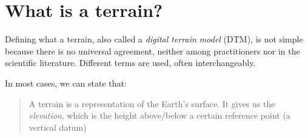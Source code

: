
\setchapterpreamble[u]{\margintoc}


\chapter{What is a terrain?}%
\label{chap:whatisterrain}

\graphicspath{{whatisterrain/}}











Defining what a terrain, also called a \emph{digital terrain model} (DTM), is not simple because there is no universal agreement, neither among practitioners nor in the scientific literature.
Different terms are used, often interchangeably.

In most cases, we can state that:

\begin{quote}
A terrain is a representation of the Earth's surface. 
It gives us the \emph{elevation}, which is the height above/below a certain reference point (a vertical datum)
\end{quote}


